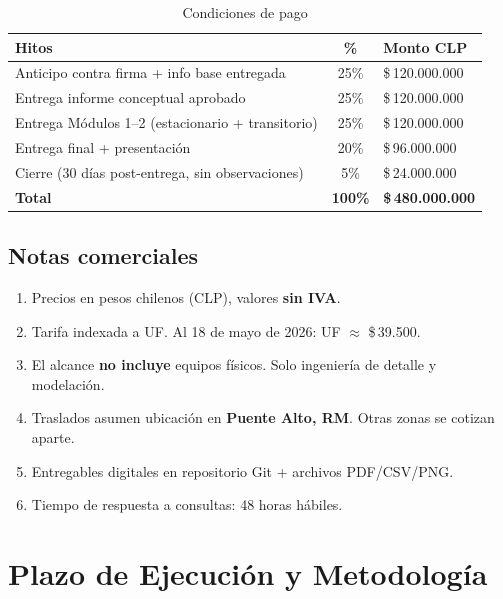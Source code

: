 \documentclass[11pt,a4paper]{article}
\begin{document}
\begin{table}[H]
\centering
\caption{Condiciones de pago}
\begin{tabular}{@{}lcl@{}}
\toprule
\textbf{Hitos} & \textbf{\%} & \textbf{Monto CLP} \\
\midrule
Anticipo contra firma + info base entregada & 25\% & \$\,120.000.000 \\
Entrega informe conceptual aprobado & 25\% & \$\,120.000.000 \\
Entrega Módulos 1--2 (estacionario + transitorio) & 25\% & \$\,120.000.000 \\
Entrega final + presentación & 20\% & \$\,96.000.000 \\
Cierre (30 días post-entrega, sin observaciones) & 5\% & \$\,24.000.000 \\
\midrule
\textbf{Total} & \textbf{100\%} & \textbf{\$\,480.000.000} \\
\bottomrule
\end{tabular}
\end{table}

\subsection{Notas comerciales}

\begin{enumerate}
  \item Precios en pesos chilenos (CLP), valores \textbf{sin IVA}.
  \item Tarifa indexada a UF. Al 18 de mayo de 2026: UF $\approx$ \$\,39.500.
  \item El alcance \textbf{no incluye} equipos físicos. Solo ingeniería de detalle y modelación.
  \item Traslados asumen ubicación en \textbf{Puente Alto, RM}. Otras zonas se cotizan aparte.
  \item Entregables digitales en repositorio Git + archivos PDF/CSV/PNG.
  \item Tiempo de respuesta a consultas: 48 horas hábiles.
\end{enumerate}

\newpage

\section{Plazo de Ejecución y Metodología}
\end{document}
